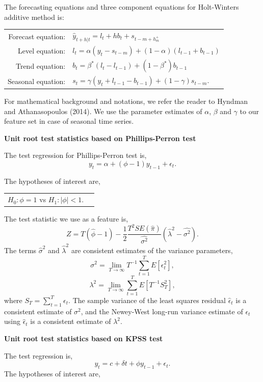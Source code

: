 \documentclass[11pt,]{article}
\theoremstyle{definition}
\theoremstyle{definition}
\theoremstyle{definition}
\theoremstyle{remark}
\begin{document}
The forecasting equations and three component equations for Holt-Winters
additive method is:

\begin{table}[!h]
\centering
\begin{tabular}{rl}
Forecast equation: &  $\hat{y}_{t+h|t}=l_t + hb_t+s_{t-m+h_m^+}$ \\
 Level equation: & $l_t = \alpha (y_t-s_{t-m}) + (1-\alpha)(l_{t-1}+b_{t-1})$ \\
Trend equation: &  $b_t=\beta^*(l_t-l_{t-1})+(1-\beta^*)b_{t-1}$\\
Seasonal equation: &  $s_t=\gamma(y_t+l_{t-1}-b_{t-1})+(1-\gamma)s_{t-m}.$
\end{tabular}
\end{table}

For mathematical background and notations, we refer the reader to
Hyndman and Athanasopoulos (2014). We use the parameter estimates of
\(\alpha\), \(\beta\) and \(\gamma\) to our feature set in case of
seasonal time series.

\textbf{Unit root test statistics based on Phillips-Perron test}

The test regression for Phillips-Perron test is,
\[ y_t=\alpha+(\phi -1)y_{t-1}+ \epsilon_t. \]

The hypotheses of interest are,

\begin{table}[!h]
\centering
\begin{tabular}{rl}
$H_0: \phi = 1$ vs
$H_1: |\phi| < 1$. 
\end{tabular}
\end{table}

The test statistic we use as a feature is,
\[Z = T(\hat{\phi}-1)-\frac{1}{2}\frac{T^2SE(\hat{\pi})}{\hat{\sigma^2}}(\hat{\lambda}^2-\hat{\sigma^2}).\]
The terms \(\hat{\sigma}^2\) and \(\hat{\lambda}^2\) are consistent
estimates of the variance parameters,
\[\sigma^2=\lim_{T\to\infty}T^{-1}\sum_{t=1}^{T}E[\epsilon_t^2],\]
\[\lambda^2=\lim_{T\to\infty}\sum_{t=1}^{T}E[T^{-1}S_T^2],\] where
\(S_T = \sum_{t=1}^{T}\epsilon_t\). The sample variance of the least
squares residual \(\hat{\epsilon}_t\) is a consistent estimate of
\(\sigma^2\), and the Newey-West long-run variance estimate of
\(\epsilon_t\) using \(\hat{\epsilon}_t\) is a consistent estimate of
\(\lambda^2\).

\textbf{Unit root test statistics based on KPSS test}

The test regression is, \[y_t=c+\delta t+\phi y_{t-1}+\epsilon_t.\] The
hypotheses of interest are,
\end{document}
